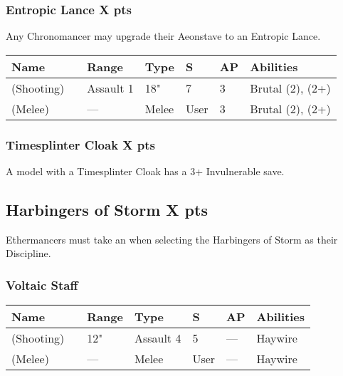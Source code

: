 \subsubsection[Entropic Lance ]{Entropic Lance  \hrulefill X pts} \label{Entropic Lance}

Any Chronomancer may upgrade their Aeonstave to an Entropic Lance.

\noindent
\begin{tabular}{||m{130pt} m{10pt} m{31pt} m{55pt} m{12pt} m{12pt} m{210pt}||}
	\hline
	Name & & Range & Type & S & AP & Abilities \\
	\hline
	\quickref{Entropic Lance} (Shooting) & & Assault 1 & 18" & 7 & 3 & Brutal (2), \quickref{Entropic Strike} (2+) \\
	\quickref{Entropic Lance} (Melee) & & — & Melee & User & 3 & Brutal (2), \quickref{Entropic Strike} (2+) \\
	\hline
\end{tabular}

\subsubsection[Timesplinter Cloak ]{Timesplinter Cloak  \hrulefill X pts}

A model with a Timesplinter Cloak has a 3+ Invulnerable save.

\subsection[Harbingers of Storm ]{Harbingers of Storm  \hrulefill X pts}

Ethermancers must take an  when selecting the Harbingers of Storm as their Discipline.

\subsubsection{Voltaic Staff}
\label{Voltaic Staff}
\noindent
\begin{tabular}{||m{130pt} m{10pt} m{31pt} m{55pt} m{12pt} m{12pt} m{210pt}||}
	\hline
	Name & & Range & Type & S & AP & Abilities \\
	\hline
	\quickref{Voltaic Staff} (Shooting) & & 12" & Assault 4 & 5 & — & Haywire \\
	\quickref{Voltaic Staff} (Melee) & & — & Melee & User & — & Haywire \\
	\hline
\end{tabular}

